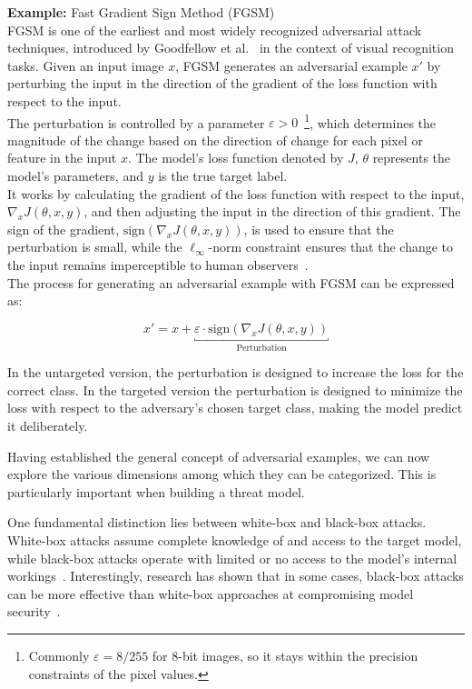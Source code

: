 \documentclass[a4paper, oneside]{discothesis}
\begin{document}
\begin{highlightbox}
	\textbf{Example:} Fast Gradient Sign Method (FGSM) \\

	FGSM is one of the earliest and most widely recognized adversarial attack techniques, introduced by Goodfellow et al.~\cite{goodfellow2014explaining} in the context of visual recognition tasks. Given an input image $x$, FGSM generates an adversarial example $x'$ by perturbing the input in the direction of the gradient of the loss function with respect to the input.\\

	The perturbation is controlled by a parameter $\varepsilon > 0$~\footnote{Commonly $\varepsilon = 8/255$ for 8-bit images, so it stays within the precision constraints of the pixel values.}, which determines the magnitude of the change based on the direction of change for each pixel or feature in the input $x$. The model's loss function denoted by $J$, $\theta$ represents the model's parameters, and $y$ is the true target label. \\
	
	It works by calculating the gradient of the loss function with respect to the input, $\nabla_x J(\theta, x, y)$, and then adjusting the input in the direction of this gradient. The sign of the gradient, $\text{sign}(\nabla_x J(\theta, x, y))$, is used to ensure that the perturbation is small, while the $\ell_\infty$-norm constraint ensures that the change to the input remains imperceptible to human observers~\cite{zhang2019adversarial}. \\
	
	The process for generating an adversarial example with FGSM can be expressed as:
	
	$$x' = x + \underbracket{\varepsilon \cdot \text{sign}(\nabla_x J(\theta, x, y))}_{\text{Perturbation}}$$
	
	In the untargeted version, the perturbation is designed to increase the loss for the correct class. In the targeted version the perturbation is designed to minimize the loss with respect to the adversary's chosen target class, making the model predict it deliberately.
\end{highlightbox}

Having established the general concept of adversarial examples, we can now explore the various dimensions among which they can be categorized. This is particularly important when building a threat model.

One fundamental distinction lies between white-box and black-box attacks. White-box attacks assume complete knowledge of and access to the target model, while black-box attacks operate with limited or no access to the model's internal workings~\cite{capozzi2024adversarial}. Interestingly, research has shown that in some cases, black-box attacks can be more effective than white-box approaches at compromising model security~\cite{capozzi2024adversarial}.
\end{document}
